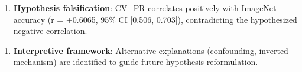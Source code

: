 \begin{enumerate}
\item \textbf{Hypothesis falsification}: CV\_PR correlates positively with ImageNet accuracy (r = +0.6065, 95\% CI [0.506, 0.703]), contradicting the hypothesized negative correlation.
\end{enumerate}

\begin{enumerate}
\item \textbf{Interpretive framework}: Alternative explanations (confounding, inverted mechanism) are identified to guide future hypothesis reformulation.
\end{enumerate}
